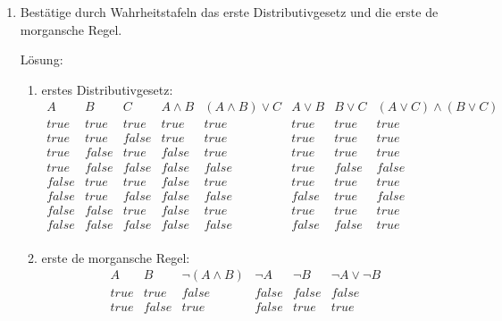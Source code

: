 \documentclass[../main.tex]{subfiles}
\begin{document}
\begin{enumerate}
	\item Bestätige durch Wahrheitstafeln das erste Distributivgesetz und die erste de morgansche Regel.

	      Lösung:
	      \begin{enumerate}
		      \item erstes Distributivgesetz:
		            \[
			            \begin{array}{cccccccc}
				            A     & B     & C     & A \land B & (A \land B ) \lor C & A \lor B & B \lor C & (A \lor C) \land (B \lor C) \\
				            \hline
				            true  & true  & true  & true      & true                & true     & true     & true                        \\
				            true  & true  & false & true      & true                & true     & true     & true                        \\
				            true  & false & true  & false     & true                & true     & true     & true                        \\
				            true  & false & false & false     & false               & true     & false    & false                       \\
				            false & true  & true  & false     & true                & true     & true     & true                        \\
				            false & true  & false & false     & false               & false    & true     & false                       \\
				            false & false & true  & false     & true                & true     & true     & true                        \\
				            false & false & false & false     & false               & false    & false    & true                        \\
			            \end{array}
		            \]
		      \item erste de morgansche Regel:
		            \[
			            \begin{array}{cccccc}
				            A     & B     & \neg (A \land B) & \neg A & \neg B & \neg A \lor \neg B \\
				            \hline
				            true  & true  & false            & false  & false  & false              \\
				            true  & false & true             & false  & true   & true               \\

\end{array}\]
\end{enumerate}
\end{enumerate}
\end{document}
